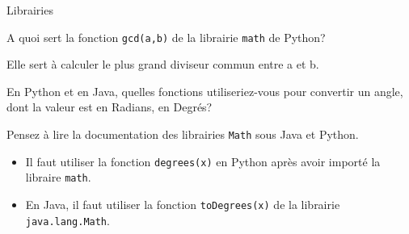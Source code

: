 \begin{section}{Librairies}
\begin{conseil}
\end{conseil} 
\begin{Exercice}[5 minutes]
	A quoi sert la fonction \lstinline{gcd(a,b)} de la librairie \lstinline{math} de Python? 
\end{Exercice} 
\begin{solution}
	Elle sert à calculer le plus grand diviseur commun entre a et b.
\end{solution} 
\begin{Exercice}[5 minutes]
    En Python et en Java, quelles fonctions utiliseriez-vous pour convertir un angle, dont la valeur est en Radians, en Degrés? 
\end{Exercice}
\begin{conseil}
    Pensez à lire la documentation des librairies \lstinline{Math} sous Java et Python.
\end{conseil}
\begin{solution}
    \begin{itemize}
        \item Il faut utiliser la fonction \lstinline{degrees(x)} en Python après avoir importé la libraire \lstinline{math}.
        \item En Java, il faut utiliser la fonction \lstinline{toDegrees(x)} de la librairie \lstinline{java.lang.Math}.
    \end{itemize}


\end{solution}
\end{section}
